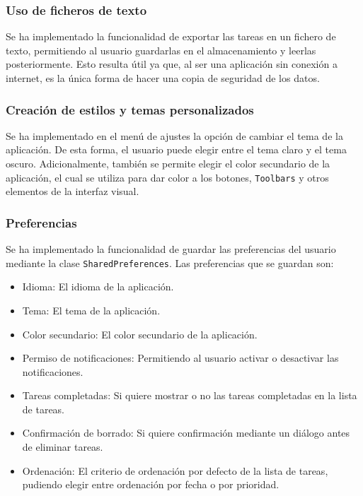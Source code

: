 \documentclass{article}
\begin{document}
\subsubsection{Uso de ficheros de texto}

Se ha implementado la funcionalidad de exportar las tareas en un fichero de texto, permitiendo al usuario guardarlas en el almacenamiento y leerlas posteriormente. Esto resulta útil ya que, al ser una aplicación sin conexión a internet, es la única forma de hacer una copia de seguridad de los datos.

\subsubsection{Creación de estilos y temas personalizados}

Se ha implementado en el menú de ajustes la opción de cambiar el tema de la aplicación. De esta forma, el usuario puede elegir entre el tema claro y el tema oscuro. Adicionalmente, también se permite elegir el color secundario de la aplicación, el cual se utiliza para dar color a los botones, \texttt{Toolbars} y otros elementos de la interfaz visual.

\subsubsection{Preferencias}

Se ha implementado la funcionalidad de guardar las preferencias del usuario mediante la clase \texttt{SharedPreferences}. Las preferencias que se guardan son:

\begin{itemize}
    \item Idioma: El idioma de la aplicación.
    \item Tema: El tema de la aplicación.
    \item Color secundario: El color secundario de la aplicación.
    \item Permiso de notificaciones: Permitiendo al usuario activar o desactivar las notificaciones.
    \item Tareas completadas: Si quiere mostrar o no las tareas completadas en la lista de tareas.
    \item Confirmación de borrado: Si quiere confirmación mediante un diálogo antes de eliminar tareas.
    \item Ordenación: El criterio de ordenación por defecto de la lista de tareas, pudiendo elegir entre ordenación por fecha o por prioridad.
\end{itemize}
\end{document}
